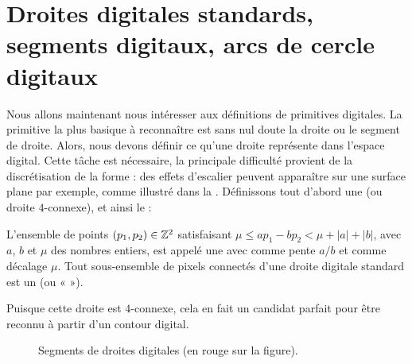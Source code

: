 \section{Droites digitales standards, segments digitaux, arcs de cercle digitaux}%
\label{sec:segments}
%
Nous allons maintenant nous intéresser aux définitions de primitives digitales.
La primitive la plus basique à reconnaître est sans nul doute la droite ou le
segment de droite. Alors, nous devons définir ce qu'une droite représente dans
l'espace digital. Cette tâche est nécessaire, la principale difficulté provient
de la discrétisation de la forme : des effets d'escalier peuvent apparaître sur
une surface plane par exemple, comme illustré dans la
. Définissons tout d'abord une  (ou droite $4$-connexe), et ainsi le  :
%
\begin{definition}{}
  \label{def:DSS}
%
  L'ensemble de points $(p_1,p_2) \in \mathbb{Z}^2$ satisfaisant $\mu \le ap_1 - bp_2 <
  \mu + |a| + |b|$, avec $a$, $b$ et $\mu$ des nombres entiers, est appelé une
   avec comme pente $a/b$ et comme décalage
  $\mu$. Tout sous-ensemble de pixels connectés d'une droite digitale standard
  est un  (ou «  »).
%
\end{definition}
%
Puisque cette droite est $4$-connexe, cela en fait un candidat parfait pour être reconnu à
partir d'un contour digital.

\begin{figure}[ht]{
    \begin{center}
    
    \end{center}}
    \caption{Segments de droites digitales (en rouge sur la figure).\label{fig:dss-figure}}
\end{figure}


